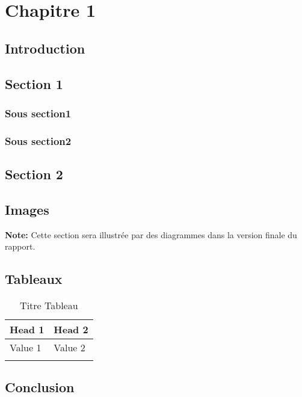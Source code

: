 \chapter{Chapitre 1}


\section*{Introduction}


\section{Section 1} 
    \subsection{Sous section1}
    \subsection{Sous section2}

\section{Section 2 }

\section{Images}

\textbf{Note:} Cette section sera illustrée par des diagrammes dans la version finale du rapport.
        
\section{Tableaux}


\begin{longtable}{|m{2cm}|m{13cm}|}
        
                \hline 
                    \textbf{Head 1} & \textbf{Head 2} \\
                \hline
                \endhead
                 \endfoot
                  \endlastfoot
                \hline 
                    Value 1
                    & 
                  Value 2
                    \\
                \hline 
            \captionsetup{justification=centering,margin=2cm}
            \caption{Titre Tableau}
            \label{tab:tab1}
               
            \end{longtable}
            
\section*{Conclusion}